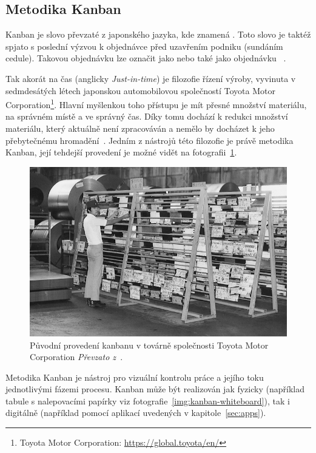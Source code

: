 \subsection{Metodika Kanban}
Kanban je slovo převzaté z japonského jazyka, kde znamená . Toto slovo je taktéž spjato s poslední výzvou k objednávce před uzavřením podniku (sundáním cedule). Takovou objednávku lze označit jako  nebo také jako objednávku ~\cite{bib:dict-kanban}. 

Tak akorát na čas (anglicky \emph{Just-in-time}) je filozofie řízení výroby, vyvinuta v sedmdesátých létech japonskou automobilovou společností Toyota Motor Corporation\footnote{Toyota Motor Corporation: \url{https://global.toyota/en/}}. Hlavní myšlenkou toho přístupu je mít přesné množství materiálu, na správném místě a ve správný čas. Díky tomu dochází k redukci množství materiálu, který aktuálně není zpracováván a nemělo by docházet k jeho přebytečnému hromadění~\cite{bib:just-in-time}. Jedním z nástrojů této filozofie je právě metodika Kanban, její tehdejší provedení je možné vidět na fotografii~\ref{img:kanban-toyota}.


\begin{figure}[H]
	\centering
	\includegraphics[width=\textwidth]{obrazky-figures/toyota-kanban.jpg}
	\caption{Původní provedení kanbanu v továrně společnosti Toyota Motor Corporation \emph{Převzato z~\cite{bib:toyota-history}}.}
	\label{img:kanban-toyota}
\end{figure}

Metodika Kanban je nástroj pro vizuální kontrolu práce a jejího toku jednotlivými fázemi procesu. Kanban může být realizován jak fyzicky (například tabule s nalepovacími papírky viz fotografie~\ref{img:kanban-whiteboard}), tak i digitálně (například pomocí aplikací uvedených v kapitole~\ref{sec:apps}). 

